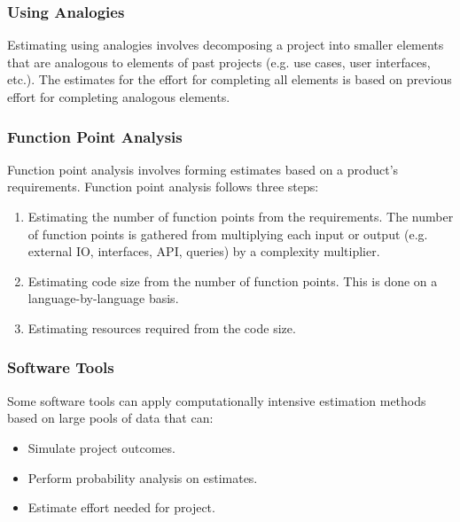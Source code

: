 \documentclass[12pt,titlepage]{article}
\begin{document}
      \subsubsection{Using Analogies}
        Estimating using analogies involves decomposing a project into smaller elements that are analogous to elements of past projects
        (e.g. use cases, user interfaces, etc.). The estimates for the effort for completing all elements is based on previous effort
        for completing analogous elements.

      \subsubsection{Function Point Analysis}
        Function point analysis involves forming estimates based on a product's requirements. Function point analysis follows three steps:
        \begin{enumerate}
          \item Estimating the number of function points from the requirements. The number of function points is gathered from multiplying
            each input or output (e.g. external IO, interfaces, API, queries) by a complexity multiplier.
          \item Estimating code size from the number of function points. This is done on a language-by-language basis.
          \item Estimating resources required from the code size.
        \end{enumerate}

      \subsubsection{Software Tools}
        Some software tools can apply computationally intensive estimation methods based on large pools of data that can:
        \begin{itemize}
          \item Simulate project outcomes.
          \item Perform probability analysis on estimates.
          \item Estimate effort needed for project.
        \end{itemize}
\end{document}
